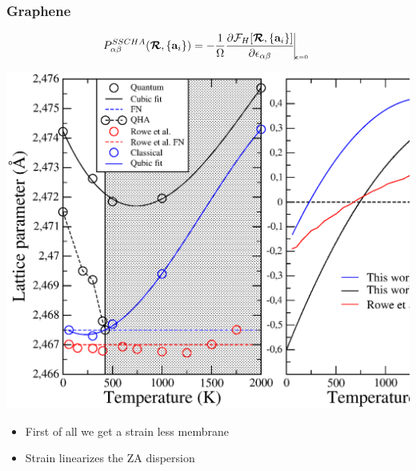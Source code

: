 \documentclass{beamer}
\begin{document}

\begin{frame}

\frametitle{Graphene}
\begin{equation}
\nonumber
 P_{\alpha\beta}^{SSCHA}(\boldsymbol{\mathcal{R}},\{\mathbf{a}_{i}\})=-\frac{1}{\Omega}\frac{\partial\mathcal{F}_{H}[\boldsymbol{\mathcal{R}},\{\mathbf{a}_{i}\}]}{\partial\epsilon_{\alpha\beta}}\vline_{_{_{_{_{_{_{_{
\boldsymbol{\epsilon}=0}}}}}}}}
\end{equation}
\begin{center}
 \includegraphics[width=0.65\linewidth]{Pictures/Graphene/lattice.eps}
\end{center}
\begin{itemize}
 \item First of all we get a strain less membrane
 \item Strain linearizes the ZA dispersion
\end{itemize}

\end{frame}

\end{document}
